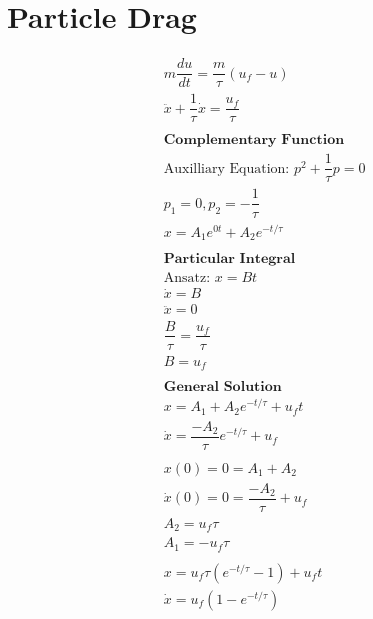\documentclass[10pt,a4paper,titlepage]{report}
\begin{document}
\section{Particle Drag}
\label{der:drag}
\begin{align*}
&m\dfrac{du}{dt} = \dfrac{m}{\tau}(u_f - u) \\
&\ddot{x} + \dfrac{1}{\tau} \dot{x} = \dfrac{u_f}{\tau} \\\\
&\textbf{Complementary Function} \\
&\text{Auxilliary Equation: } p^2 + \dfrac{1}{\tau}p = 0 \\
&p_1 = 0, p_2 = - \dfrac{1}{\tau} \\
&x = A_1e^{0t} + A_2e^{-t/\tau} \\\\
&\textbf{Particular Integral} \\
&\text{Ansatz: } x = Bt \\
&\dot{x} = B \\
&\ddot{x} = 0 \\
&\dfrac{B}{\tau} = \dfrac{u_f}{\tau} \\
&B = u_f \\\\
&\textbf{General Solution} \\
&x = A_1 + A_2 e^{-t /\tau} + u_f t \\
&\dot{x} = \dfrac{-A_2}{\tau} e^{-t/\tau} + u_f \\\\
&x(0) = 0 = A_1 + A_2 \\
&\dot{x}(0) = 0 = \dfrac{-A_2}{\tau} + u_f \\
&A_2 = u_f \tau \\
&A_1 = - u_f \tau \\\\
&x = u_f \tau (e^{-t/\tau} - 1) + u_f t \\
&\dot{x} = u_f (1 - e^{-t/\tau}) \\
\end{align*}


\end{document}
